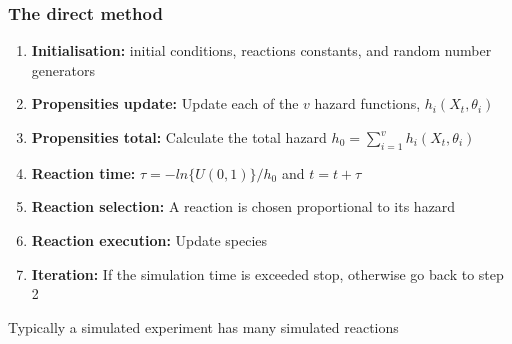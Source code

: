 \documentclass[t,compress]{beamer}
\begin{document}
\begin{frame}

\frametitle{The direct method}

\begin{enumerate}
\item \textbf{Initialisation:} initial conditions, reactions constants, and random number generators
\item \textbf{\alert<2>{Propensities update:}} Update each of the $v$ hazard
  functions, $h_i(X_t, \theta_i)$
\item \textbf{Propensities total:} Calculate the total hazard $h_0 =
  \sum_{i=1}^v h_i(X_t, \theta_i)$
\item \textbf{\alert<3>{Reaction time:}} $\tau = -ln\{U(0,1)\}/h_0$ and $t = t+ \tau$
\item \textbf{\alert<4>{Reaction selection:}} A reaction is chosen proportional to its
  hazard
\item \textbf{Reaction execution:} Update species
\item \textbf{Iteration:} If the simulation time is exceeded stop, otherwise go back to step 2
\end{enumerate}
\alert<2->{Typically a simulated experiment has many simulated reactions}
\end{frame}
\end{document}
